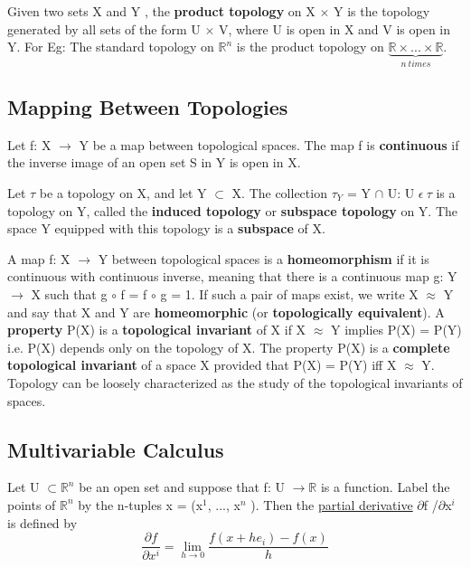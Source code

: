 Given two sets X and Y , the \textbf{product topology} on X $\times$ Y is the topology generated
by all sets of the form U $\times$ V, where U is open in X and V is open in Y. 
For Eg: The standard topology on $\mathbb{R}^n$ is the product topology on $\underbrace{\mathbb{R} \times ... \times \mathbb{R}}_{n \:times}$.

\subsection{Mapping Between Topologies}
Let f: X $\rightarrow$ Y be a map between topological spaces. The map f is \textbf{continuous}
if the inverse image of an open set S in Y is open in X.

Let $\tau$ be a topology on X, and let Y $\subset$ X. 
The collection $\tau_Y$ = {Y $\cap$ U: U $\epsilon \: \tau$} is a topology on Y, called the \textbf{induced topology} or \textbf{subspace topology} on Y. 
The space Y equipped with this topology is a \textbf{subspace} of X.

A map f: X $\rightarrow$ Y between topological spaces is a \textbf{homeomorphism} if it is
continuous with continuous inverse, meaning that there is a continuous map g: Y $\rightarrow$ X  such that g $\circ$ f = f $\circ$ g = 1. 
If such a pair of maps exist, we write X $\approx$ Y and say that X and Y are \textbf{homeomorphic} (or \textbf{topologically equivalent}). 
A \textbf{property} P(X) is a \textbf{topological invariant} of X if X $\approx$ Y implies P(X) = P(Y) i.e.
P(X) depends only on the topology of X. The property P(X) is a \textbf{complete topological invariant} of a space X provided that P(X) = P(Y) iff X $\approx$ Y. 
Topology can be loosely characterized as the study of the topological invariants of spaces.

\subsection{Multivariable Calculus} \label{Multivariable Calculus}
Let U $\subset \mathbb{R}^n$ be an open set and suppose that f: U $\rightarrow \mathbb{R}$ is a function. 
Label the points of $\mathbb{R}^n$ by the n-tuples x = (x$^1$, ..., x$^n$ ). Then the \href{https://en.wikipedia.org/wiki/Partial_derivative}{partial derivative} $\partial$f /$\partial$x$^i$
is defined by
\begin{equation}
    \frac{\partial f}{\partial x^i} = \lim_{h \rightarrow 0} \frac{f(x+he_i) - f(x)}{h}
\end{equation}

